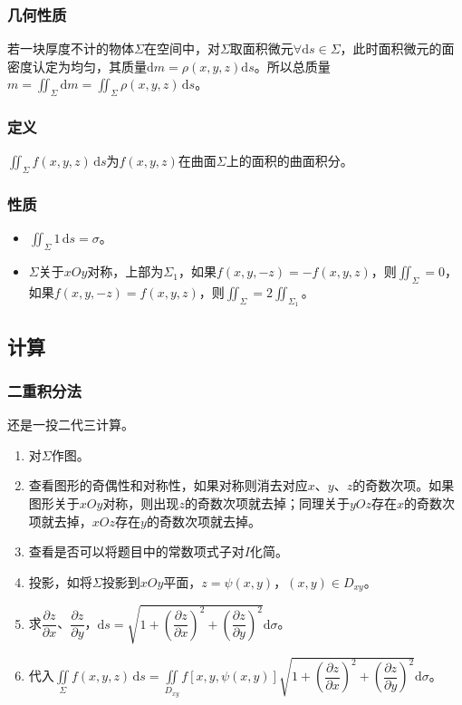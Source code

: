\documentclass[UTF8, 12pt]{ctexart}
\begin{document}
        \subsubsection{几何性质}

        若一块厚度不计的物体$\Sigma$在空间中，对$\Sigma$取面积微元$\forall\textrm{d}s\in\Sigma$，此时面积微元的面密度认定为均匀，其质量$\textrm{d}m=\rho(x,y,z)\textrm{d}s$。所以总质量$m=\iint_\Sigma\textrm{d}m=\iint_\Sigma\rho(x,y,z)\,\textrm{d}s$。

        \subsubsection{定义}

        $\iint_\Sigma f(x,y,z)\,\textrm{d}s$为$f(x,y,z)$在曲面$\Sigma$上的面积的曲面积分。

        \subsubsection{性质}

        \begin{itemize}
            \item $\iint_\Sigma1\,\textrm{d}s=\sigma$。
            \item $\Sigma$关于$xOy$对称，上部为$\Sigma_1$，如果$f(x,y,-z)=-f(x,y,z)$，则$\iint_\Sigma=0$，如果$f(x,y,-z)=f(x,y,z)$，则$\iint_\Sigma=2\iint_{\Sigma_1}$。
        \end{itemize}

        \subsection{计算}

        \subsubsection{二重积分法}

        还是一投二代三计算。

        \begin{enumerate}
            \item 对$\Sigma$作图。
            \item 查看图形的奇偶性和对称性，如果对称则消去对应$x$、$y$、$z$的奇数次项。如果图形关于$xOy$对称，则出现$z$的奇数次项就去掉；同理关于$yOz$存在$x$的奇数次项就去掉，$xOz$存在$y$的奇数次项就去掉。
            \item 查看是否可以将题目中的常数项式子对$I$化简。
            \item 投影，如将$\Sigma$投影到$xOy$平面，$z=\psi(x,y)$，$(x,y)\in D_{xy}$。
            \item 求$\dfrac{\partial z}{\partial x}$、$\dfrac{\partial z}{\partial y}$，$\textrm{d}s=\sqrt{1+\left(\dfrac{\partial z}{\partial x}\right)^2+\left(\dfrac{\partial z}{\partial y}\right)^2}\textrm{d}\sigma$。
            \item 代入$\displaystyle{\iint\limits_\Sigma f(x,y,z)\,\textrm{d}s=\iint\limits_{D_{xy}}f[x,y,\psi(x,y)]\sqrt{1+\left(\dfrac{\partial z}{\partial x}\right)^2+\left(\dfrac{\partial z}{\partial y}\right)^2}\textrm{d}\sigma}$。
        \end{enumerate}
\end{document}
